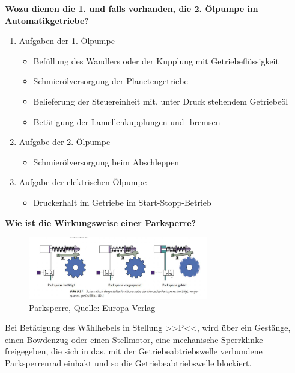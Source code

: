 \newpage

\textbf{Wozu dienen die 1. und falls vorhanden, die 2. Ölpumpe im
Automatikgetriebe?}

\begin{enumerate}
\item
  Aufgaben der 1. Ölpumpe

  \begin{itemize}
  \item
    Befüllung des Wandlers oder der Kupplung mit Getriebeflüssigkeit
  \item
    Schmierölversorgung der Planetengetriebe
  \item
    Belieferung der Steuereinheit mit, unter Druck stehendem Getriebeöl
  \item
    Betätigung der Lamellenkupplungen und -bremsen
  \end{itemize}
\item
  Aufgabe der 2. Ölpumpe

  \begin{itemize}
  \item
    Schmierölversorgung beim Abschleppen
  \end{itemize}
\item
  Aufgabe der elektrischen Ölpumpe

  \begin{itemize}
  \item
    Druckerhalt im Getriebe im Start-Stopp-Betrieb
  \end{itemize}
\end{enumerate}

\textbf{Wie ist die Wirkungsweise einer Parksperre?}

\begin{figure}[!ht]%
\centering
\includegraphics[width=0.7\textwidth]{images/Automatikgetriebe/Automatikgetriebe-9.pdf}
\caption{Parksperre, Quelle: Europa-Verlag}
\end{figure}

Bei Betätigung des Wählhebels in Stellung >>P<<, wird über ein Gestänge,
einen Bowdenzug oder einen Stellmotor, eine mechanische Sperrklinke
freigegeben, die sich in das, mit der Getriebeabtriebswelle verbundene
Parksperrenrad einhakt und so die Getriebeabtriebswelle blockiert.


